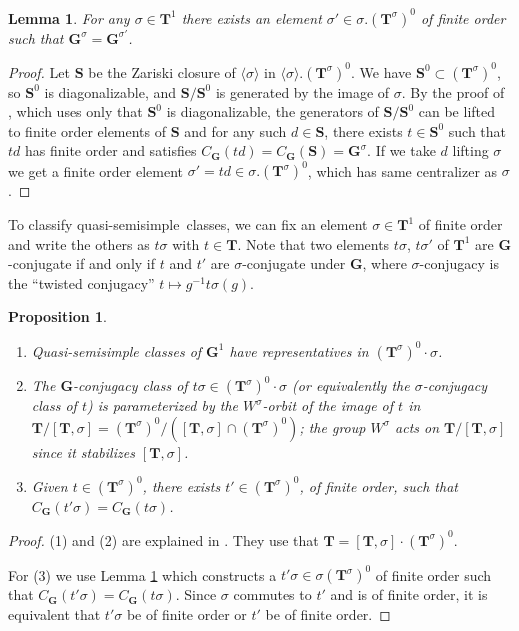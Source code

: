 \documentclass{amsart}
\newtheorem{lemma}[equation]{Lemma}
\newtheorem{proposition}[equation]{Proposition}
\numberwithin{equation}{section}
\theoremstyle{definition}
\theoremstyle{remark}
\newcommand\bG{{\mathbf G}}
\newcommand\bS{{\mathbf S}}
\newcommand\bT{{\mathbf T}}
\newcommand\Gun{{\bG^1}}
\newcommand\Tun{{\bT^1}}
\newcommand\Gs{{\bG^\sigma}}
\newcommand\Tso{{(\bT^\sigma)^0}}
\newcommand\LT{{\bT/[\bT,\sigma]}}
\newcommand\inv{^{-1}}
\newcommand\qss{quasi-semisimple}
\newcommand\genby[1]{\mathopen\langle#1\mathclose\rangle}
\begin{document}
\begin{lemma}\label{finite order}
For any $\sigma\in \Tun$ there exists an element $\sigma'\in \sigma.\Tso$ of
finite order such that $\Gs=\bG^{\sigma'}$.
\end{lemma}
\begin{proof}
Let $\bS$ be the Zariski closure of $\genby\sigma$ in $\genby\sigma
.\Tso$. We have $\bS^0\subset\Tso$,
so $\bS^0$ is diagonalizable, and $\bS/\bS^0$ is generated by the
image of $\sigma$. By the proof of \cite[Lemma 1.6]{cedric}, which uses
only that $\bS^0$ is diagonalizable, the generators of $\bS/\bS^0$ can be lifted to finite
order elements of $\bS$ and for any such $d\in\bS$, there exists $t\in
\bS^0$ such that  $td$ has finite order and satisfies
$C_\bG(td)=C_\bG(\bS)=\Gs$. If we take $d$ lifting $\sigma$ we get
a finite order element $\sigma'=td\in \sigma.\Tso$, which has same centralizer as $\sigma$.
\end{proof}

To classify \qss\ classes, we can fix an element
$\sigma\in\Tun$ of finite order and write the others as $t\sigma$ with $t\in\bT$.
Note that two elements $t\sigma$, $t\sigma'$ of $\Tun$ are $\bG$-conjugate
if and only if $t$ and $t'$ are $\sigma$-conjugate under $\bG$, where
$\sigma$-conjugacy is the ``twisted conjugacy'' $t\mapsto g\inv t\sigma(g)$.
\begin{proposition}\label{omnibus}~
\begin{enumerate}
\item Quasi-semisimple classes of $\Gun$ have representatives in 
$\Tso\cdot\sigma$.
\item  
The $\bG$-conjugacy class of $t\sigma\in\Tso\cdot\sigma$ (or equivalently the
$\sigma$-conjugacy class of $t$) is parameterized by the
$W^\sigma$-orbit of the image of $t$ in
$\LT=\Tso/([\bT,\sigma]\cap\Tso)$; the group $W^\sigma$ acts on 
$\LT$ since it stabilizes $[\bT,\sigma]$.
\item
Given $t\in\Tso$, there exists $t'\in\Tso$, of finite order, such that 
$C_\bG(t'\sigma)=C_\bG(t\sigma)$.
\end{enumerate}
\end{proposition}
\begin{proof}
(1) and (2) are explained in \cite[7.1, 7.2]{grnccomp}. They use that
$\bT=[\bT,\sigma]\cdot\Tso$.

For (3) we use Lemma \ref{finite order} 
which constructs a $t'\sigma\in\sigma\Tso$ of finite
order such that $C_\bG(t'\sigma)=C_\bG(t\sigma)$. Since $\sigma$ commutes
to $t'$ and is of finite order, it is equivalent that $t'\sigma$ be of 
finite order or $t'$ be of finite order.
\end{proof}
\end{document}
